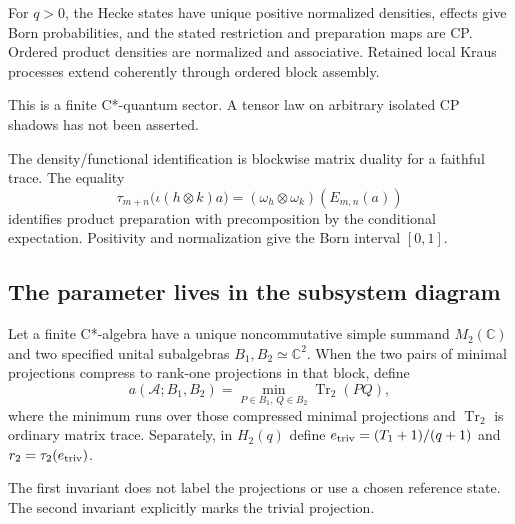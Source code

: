 \begin{theorem}
{\normalfont\statusProved}\quad For $q>0$, the Hecke states have unique
positive normalized densities, effects give Born probabilities, and the
stated restriction and preparation maps are CP. Ordered product densities
are normalized and associative. Retained local Kraus processes extend
coherently through ordered block assembly.
\end{theorem}
\begin{scope}This is a finite C*-quantum sector. A tensor law on arbitrary
isolated CP shadows has not been asserted.\end{scope}

The density/functional identification is blockwise matrix duality for a
faithful trace. The equality
\[
\tau_{m+n}\bigl(\iota(h\otimes k)a\bigr)
=(\omega_h\otimes\omega_k)(E_{m,n}(a))
\]
identifies product preparation with precomposition by the conditional
expectation. Positivity and normalization give the Born interval $[0,1]$.

\subsection{The parameter lives in the subsystem diagram}

\begin{definition}
Let a finite C*-algebra have a unique noncommutative simple summand
$M_2(\mathbb C)$ and two specified unital subalgebras $B_1,B_2\simeq
\mathbb C^2$. When the two pairs of minimal projections compress to
rank-one projections in that block, define
\[
a(\mathcal A;B_1,B_2)=\min_{P\in B_1,\,Q\in B_2}\operatorname{Tr}_2(PQ),
\]
where the minimum runs over those compressed minimal projections and
$\operatorname{Tr}_2$ is ordinary matrix trace. Separately, in $H_2(q)$
define $e_{\rm triv}=(T_1+1)/(q+1)$ and $r_2=\tau_2(e_{\rm triv})$.
\end{definition}
\begin{scope}The first invariant does not label the projections or use a
chosen reference state. The second invariant explicitly marks the trivial
projection.\end{scope}

